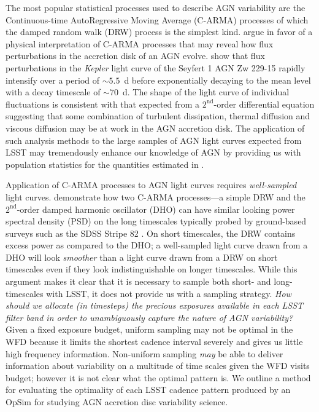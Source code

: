 \documentclass[times,preprint]{aastex}
\begin{document}
The most popular statistical processes used to describe AGN variability are the Continuous-time AutoRegressive Moving Average (C-ARMA) processes \citep{Kelly14, Brockwell14} of which the damped random walk (DRW) process \citep{Kelly09} is the simplest kind. \citet{KasliwalCARMA} argue in favor of a physical interpretation of C-ARMA processes that may reveal how flux perturbations in the accretion disk of an AGN evolve. \citet{KasliwalCARMA} show that flux perturbations in the \textit{Kepler} light curve of the Seyfert 1 AGN Zw 229-15 rapidly intensify over a period of $\sim 5.5$~d before exponentially decaying to the mean level with a decay timescale of $\sim 70$~d. The shape of the light curve of individual fluctuations is consistent with that expected from a $2^{\mathrm{nd}}$-order differential equation suggesting that some combination of turbulent dissipation, thermal diffusion and viscous diffusion may be at work in the AGN accretion disk. The application of such analysis methods to the large samples of AGN light curves expected from LSST may tremendously enhance our knowledge of AGN by providing us with population statistics for the quantities estimated in \citet{KasliwalCARMA}.

Application of C-ARMA processes to AGN light curves requires \textit{well-sampled} light curves. \citet{KasliwalCARMA} demonstrate how two C-ARMA processes---a simple DRW and the $2^{\mathrm{nd}}$-order damped harmonic oscillator (DHO) can have similar looking power spectral density (PSD) on the long timescales typically probed by ground-based surveys such as the SDSS Stripe 82 \citep{S82}. On short timescales, the DRW contains excess power as compared to the DHO; a well-sampled light curve drawn from a DHO will look \textit{smoother} than a light curve drawn from a DRW on short timescales even if they look indistinguishable on longer timescales. While this argument makes it clear that it is necessary to sample both short- and long-timescales with LSST, it does not provide us with a sampling strategy. \textit{How should we allocate (in timesteps) the precious exposures available in each LSST filter band in order to unambiguously capture the nature of AGN variability?} Given a fixed exposure budget, uniform sampling may not be optimal in the WFD because it limits the shortest cadence interval severely and gives us little high frequency information. Non-uniform sampling \textit{may} be able to deliver information about variability on a multitude of time scales given the WFD visits budget; however it is not clear what the optimal pattern is. We outline a method for evaluating the optimality of each LSST cadence pattern produced by an OpSim for studying AGN accretion disc variability science.
\end{document}
